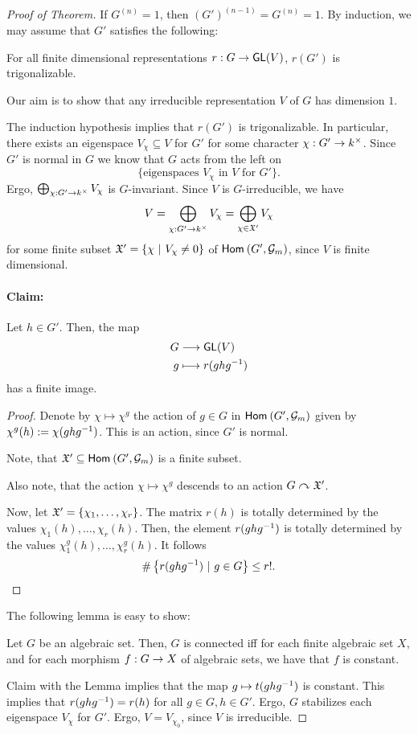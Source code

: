 \begin{proof}[Proof of Theorem]
If $G^{(n)} = 1$, then $(G')^{(n-1)} = G^{(n)} = 1$. By induction, we may assume that $G'$ satisfies the following:

For all finite dimensional representations $r : G \overset{}{\rightarrow} \textsf{GL}(V)$, $r(G')$ is trigonalizable.



Our aim is to show that any irreducible representation $V$ of $G$ has dimension $1$.

The induction hypothesis implies that $r(G')$ is trigonalizable. In particular, there exists an eigenspace $V_\chi \subseteq V$ for $G'$ for some character $\chi : G' \overset{}{\rightarrow} k^\times$. Since $G'$ is normal in $G$ we know that $G$ acts from the left on
\[\{ \text{eigenspaces }V_\chi \text{ in } V \text{ for } G' \}.\] 
Ergo, $\bigoplus_{\chi : G' \overset{}{\rightarrow} k^\times}V_\chi$ is $G$-invariant.
Since $V$ is $G$-irreducible, we have
\[ V = \bigoplus_{\chi : G' \overset{}{\rightarrow} k^\times}V_\chi = \bigoplus_{\chi \in \mathfrak{X}'}V_\chi  \]
for some finite subset $\mathfrak{X}' = \left\lbrace\chi ~ | ~ V_\chi \neq 0\right\rbrace$ of $\textsf{Hom}_{}\left(G', \mathcal{G}_m\right)$, since $V$ is finite dimensional.

\paragraph{Claim:} Let $h \in G'$. Then, the map
\begin{align*}
G & \overset{}{\longrightarrow} \textsf{GL}(V)\\
g & \longmapsto r(ghg^{-1})
\end{align*}
has a finite image.
\begin{proof}
	Denote by $\chi \mapsto \chi^g$ the action of $g \in G$ in $\textsf{Hom}_{}\left(G', \mathcal{G}_m\right)$ given by $\chi^g(h) := \chi(ghg^{-1})$. This is an action, since $G'$ is normal.
	
	Note, that $\mathfrak{X}'\subseteq \textsf{Hom}_{}\left(G', \mathcal{G}_m\right)$ is a finite subset.
	
	Also note, that the action $\chi \mapsto \chi^g$ descends to an action $G\curvearrowright \mathfrak{X}' $.
	
	
	Now, let $\mathfrak{X}' = \{\chi_1,\ldots, \chi_r\}$. The matrix $r(h)$ is totally determined by the values $\chi_1(h), \ldots, \chi_r(h)$. Then, the element $r(ghg^{-1})$ is totally determined by the values $\chi_1^g(h), \ldots, \chi_r^g(h)$. It follows
	\[ \# \left\lbrace r(ghg^{-1}) ~ | ~ g \in G\right\rbrace \leq r!. \]
\end{proof}
The following lemma is easy to show:
\begin{lemma}
Let $G$ be an algebraic set. Then, $G$ is connected iff for each finite algebraic set $X$, and for each morphism $f : G \overset{}{\rightarrow} X$ of algebraic sets, we have that $f$ is constant.
\end{lemma}
Claim with the Lemma implies that the map $g \mapsto t(ghg^{-1})$ is constant. This implies that $r(ghg^{-1}) = r(h)$ for all $g \in G, h \in G'$. Ergo, $G$ stabilizes each eigenspace $V_\chi$ for $G'$. Ergo, $V = V_{\chi_0}$, since $V$ is irreducible.



\end{proof}
